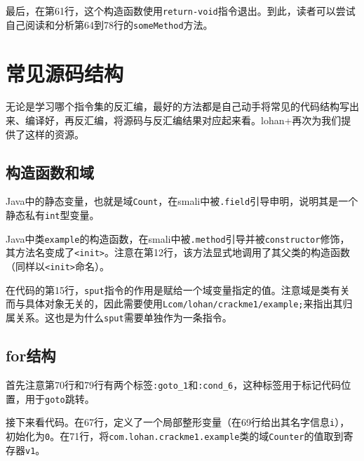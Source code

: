 最后，在第61行，这个构造函数使用\lstinline!return-void!指令退出。到此，读者可以尝试自己阅读和分析第64到78行的\lstinline!someMethod!方法。

\section{常见源码结构}
无论是学习哪个指令集的反汇编，最好的方法都是自己动手将常见的代码结构写出来、编译好，再反汇编，将源码与反汇编结果对应起来看。lohan+再次为我们提供了这样的资源。

\subsection{构造函数和域}



Java中的静态变量，也就是域\lstinline!Count!，在smali中被\lstinline!.field!引导申明，说明其是一个静态私有\lstinline!int!型变量。

Java中类\lstinline!example!的构造函数，在smali中被\lstinline!.method!引导并被\lstinline!constructor!修饰，其方法名变成了\lstinline!<init>!。注意在第12行，该方法显式地调用了其父类的构造函数（同样以\lstinline!<init>!命名）。

在代码的第15行，\lstinline!sput!指令的作用是赋给一个域变量指定的值。注意域是类有关而与具体对象无关的，因此需要使用\lstinline!Lcom/lohan/crackme1/example;!来指出其归属关系。这也是为什么\lstinline!sput!需要单独作为一条指令。

\subsection{for结构}
\label{SubSec:dalvik-smali-for}




首先注意第70行和79行有两个标签\lstinline!:goto_1!和\lstinline!:cond_6!，这种标签用于标记代码位置，用于\lstinline!goto!跳转。

接下来看代码。在67行，定义了一个局部整形变量（在69行给出其名字信息\lstinline!i!），初始化为\lstinline!0!。在71行，将\lstinline!com.lohan.crackme1.example!类的域\lstinline!Counter!的值取到寄存器\lstinline!v1!。

